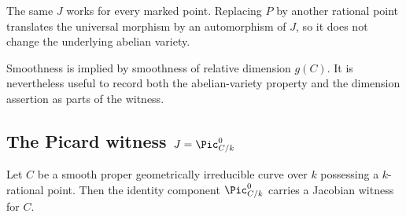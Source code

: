 \begin{remark}
  \label{rem:JacobianWitness_quantifier_order}
  The same \(J\) works for every marked point.  Replacing \(P\) by another
  rational point translates the universal morphism by an automorphism of
  \(J\), so it does not change the underlying abelian variety.
\end{remark}

\begin{remark}
  \label{rem:JacobianWitness_smooth_redundancy}
  Smoothness is implied by smoothness of relative dimension \(g(C)\).  It is
  nevertheless useful to record both the abelian-variety property and the
  dimension assertion as parts of the witness.
\end{remark}

\subsection{The Picard witness \(J=\Pic^0_{C/k}\)}
\label{sec:picardJacobianWitness}

\begin{theorem}
  \label{def:picardJacobianWitnessOfHasRationalPoint}
  Let \(C\) be a smooth proper geometrically irreducible curve over \(k\)
  possessing a \(k\)-rational point. Then the identity component
  \(\Pic^0_{C/k}\) carries a Jacobian witness for \(C\).
\end{theorem}

